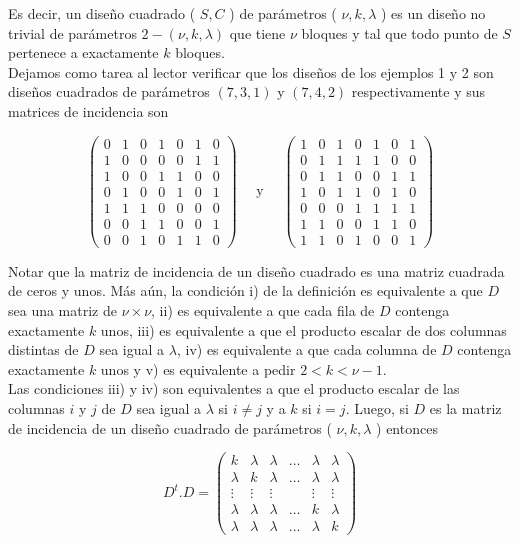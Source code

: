 \documentclass[10pt]{article}
\begin{document}
Es decir, un diseño cuadrado ( $S, C$ ) de parámetros ( $\nu, k, \lambda$ ) es un diseño no trivial de parámetros $2-(\nu, k, \lambda)$ que tiene $\nu$ bloques y tal que todo punto de $S$ pertenece a exactamente $k$ bloques.\\
Dejamos como tarea al lector verificar que los diseños de los ejemplos 1 y 2 son diseños cuadrados de parámetros $(7,3,1)$ y $(7,4,2)$ respectivamente y sus matrices de incidencia son

$$
\left(\begin{array}{lllllll}
0 & 1 & 0 & 1 & 0 & 1 & 0 \\
1 & 0 & 0 & 0 & 0 & 1 & 1 \\
1 & 0 & 0 & 1 & 1 & 0 & 0 \\
0 & 1 & 0 & 0 & 1 & 0 & 1 \\
1 & 1 & 1 & 0 & 0 & 0 & 0 \\
0 & 0 & 1 & 1 & 0 & 0 & 1 \\
0 & 0 & 1 & 0 & 1 & 1 & 0
\end{array}\right) \quad \text { y } \quad\left(\begin{array}{lllllll}
1 & 0 & 1 & 0 & 1 & 0 & 1 \\
0 & 1 & 1 & 1 & 1 & 0 & 0 \\
0 & 1 & 1 & 0 & 0 & 1 & 1 \\
1 & 0 & 1 & 1 & 0 & 1 & 0 \\
0 & 0 & 0 & 1 & 1 & 1 & 1 \\
1 & 1 & 0 & 0 & 1 & 1 & 0 \\
1 & 1 & 0 & 1 & 0 & 0 & 1
\end{array}\right)
$$

Notar que la matriz de incidencia de un diseño cuadrado es una matriz cuadrada de ceros y unos. Más aún, la condición i) de la definición es equivalente a que $D$ sea una matriz de $\nu \times \nu$, ii) es equivalente a que cada fila de $D$ contenga exactamente $k$ unos, iii) es equivalente a que el producto escalar de dos columnas distintas de $D$ sea igual a $\lambda$, iv) es equivalente a que cada columna de $D$ contenga exactamente $k$ unos y v) es equivalente a pedir $2<k<\nu-1$.\\
Las condiciones iii) y iv) son equivalentes a que el producto escalar de las columnas $i$ y $j$ de $D$ sea igual a $\lambda$ si $i \neq j$ y a $k$ si $i=j$. Luego, si $D$ es la matriz de incidencia de un diseño cuadrado de parámetros ( $\nu, k, \lambda$ ) entonces

$$
D^{t} . D=\left(\begin{array}{cccccc}
k & \lambda & \lambda & \ldots & \lambda & \lambda \\
\lambda & k & \lambda & \ldots & \lambda & \lambda \\
\vdots & \vdots & \vdots & & \vdots & \vdots \\
\lambda & \lambda & \lambda & \ldots & k & \lambda \\
\lambda & \lambda & \lambda & \ldots & \lambda & k
\end{array}\right)
$$
\end{document}
